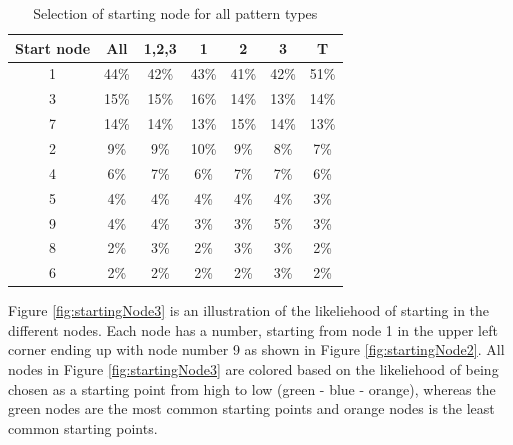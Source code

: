   \begin{table}[H]
    \centering
    \begin{tabular}{ c || c | c || c | c | c | c }
      \hline
      {\bf Start node} & All & 1,2,3 & 1 & 2 & 3 & T \\ \hline
      1 & 44\% & 42\% & 43\% & 41\% & 42\% & 51\% \\
      3 & 15\% & 15\% & 16\% & 14\% & 13\% & 14\% \\
      7 & 14\% & 14\% & 13\% & 15\% & 14\% & 13\% \\
      2 & 9\%  & 9\%  & 10\% & 9\%  & 8\%  & 7\%  \\
      4 & 6\%  & 7\%  & 6\%  & 7\%  & 7\%  & 6\%  \\
      5 & 4\%  & 4\%  & 4\%  & 4\%  & 4\%  & 3\%  \\
      9 & 4\%  & 4\%  & 3\%  & 3\%  & 5\%  & 3\%  \\
      8 & 2\%  & 3\%  & 2\%  & 3\%  & 3\%  & 2\%  \\
      6 & 2\%  & 2\%  & 2\%  & 2\%  & 3\%  & 2\%  \\ \hline
    \end{tabular}
    \caption{Selection of starting node for all pattern types}
    \label{tab:startingNode1}
  \end{table}

  Figure \ref{fig:startingNode3} is an illustration of the likeliehood of starting in the different nodes. Each node has a number, starting from node 1 in the upper left corner ending up with node number 9 as shown in Figure \ref{fig:startingNode2}. All nodes in Figure \ref{fig:startingNode3} are colored based on the likeliehood of being chosen as a starting point from high to low (green - blue - orange), whereas the green nodes are the most common starting points and orange nodes is the least common starting points.

